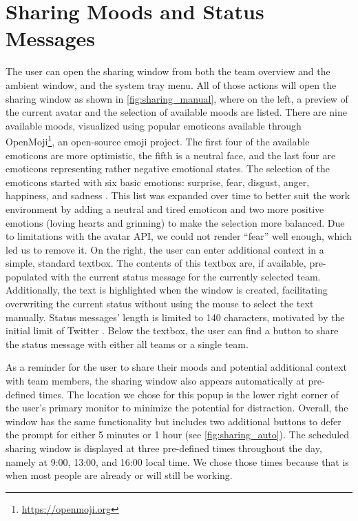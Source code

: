 \section{Sharing Moods and Status Messages}
The user can open the sharing window from both the team overview and the ambient window, and the system tray menu. All of those actions will open the sharing window as shown in \autoref{fig:sharing_manual}, where on the left, a preview of the current avatar and the selection of available moods are listed. There are nine available moods, visualized using popular emoticons available through OpenMoji\footnote{\url{https://openmoji.org}}, an open-source emoji project. The first four of the available emoticons are more optimistic, the fifth is a neutral face, and the last four are emoticons representing rather negative emotional states. The selection of the emoticons started with six basic emotions: surprise, fear, disgust, anger, happiness, and sadness \autocite{an2017two}. This list was expanded over time to better suit the work environment by adding a neutral and tired emoticon and two more positive emotions (loving hearts and grinning) to make the selection more balanced. Due to limitations with the avatar API, we could not render \enquote{fear} well enough, which led us to remove it. On the right, the user can enter additional context in a simple, standard textbox. The contents of this textbox are, if available, pre-populated with the current status message for the currently selected team. Additionally, the text is highlighted when the window is created, facilitating overwriting the current status without using the mouse to select the text manually. Status messages' length is limited to 140 characters, motivated by the initial limit of Twitter \autocite{dullemond2013fixing}. Below the textbox, the user can find a button to share the status message with either all teams or a single team.

As a reminder for the user to share their moods and potential additional context with team members, the sharing window also appears automatically at pre-defined times. The location we chose for this popup is the lower right corner of the user's primary monitor to minimize the potential for distraction. Overall, the window has the same functionality but includes two additional buttons to defer the prompt for either 5 minutes or 1 hour (see \autoref{fig:sharing_auto}). The scheduled sharing window is displayed at three pre-defined times throughout the day, namely at 9:00, 13:00, and 16:00 local time. We chose those times because that is when most people are already or will still be working.

